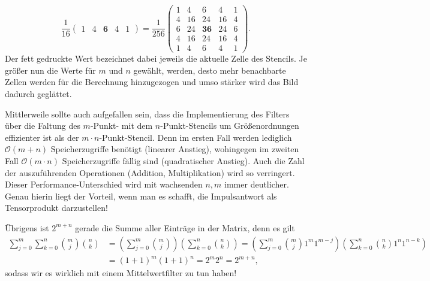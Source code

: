 \begin{example}
\begin{description}
\[        \frac{1}{16} \begin{pmatrix} 1 & 4 & \mathbf{6} & 4 & 1 \end{pmatrix}
    = \frac{1}{256} \begin{pmatrix}
        1 &  4 & 6  & 4  & 1 \\
        4 & 16 & 24 & 16 & 4 \\
        6 & 24 & \mathbf{36} & 24 & 6 \\
        4 & 16 & 24 & 16 & 4 \\
        1 &  4 &  6 &  4 & 1
      \end{pmatrix}.
  \]
  Der fett gedruckte Wert bezeichnet dabei jeweils die aktuelle Zelle des Stencils. Je größer nun 
  die Werte für $ m $ und $ n $ gewählt, werden, desto mehr benachbarte Zellen werden für die
  Berechnung hinzugezogen und umso stärker wird das Bild dadurch geglättet.
  
  Mittlerweile sollte auch aufgefallen sein, dass die Implementierung des Filters über die Faltung
  des $ m $-Punkt- mit dem $ n $-Punkt-Stencils um Größenordnungen effizienter ist als der
  $ m \cdot n $-Punkt-Stencil. Denn im ersten Fall werden lediglich $ \mathcal{O}(m + n) $ 
  Speicherzugriffe benötigt (linearer Anstieg), wohingegen im zweiten Fall 
  $ \mathcal{O}(m \cdot n) $ Speicherzugriffe fällig sind (quadratischer Anstieg). Auch die Zahl
  der auszuführenden Operationen (Addition, Multiplikation) wird so verringert. Dieser 
  Performance-Unterschied wird mit wachsenden $ n, m $ immer deutlicher. Genau hierin liegt der 
  Vorteil, wenn man es schafft, die Impulsantwort als Tensorprodukt darzustellen!
  
  Übrigens ist $ 2^{m + n} $ gerade die Summe aller Einträge in der Matrix, denn es gilt
  \begin{align*}
      \sum_{j = 0}^{m} \sum_{k = 0}^{n} \binom{m}{j} \binom{n}{k}
   &= \left( \sum_{j = 0}^{m} \binom{m}{j} \right) \left( \sum_{k = 0}^{n} \binom{n}{k} \right)
    = \left( \sum_{j = 0}^{m} \binom{m}{j} 1^{m} 1^{m - j} \right) 
        \left( \sum_{k = 0}^{n} \binom{n}{k} 1^{n} 1^{n - k} \right) \\
   &= (1 + 1)^{m} (1 + 1)^{n}
    = 2^{m} 2^{n}
    = 2^{m + n},
  \end{align*}
  sodass wir es wirklich mit einem Mittelwertfilter zu tun haben!
  

\end{description}
\end{example}
